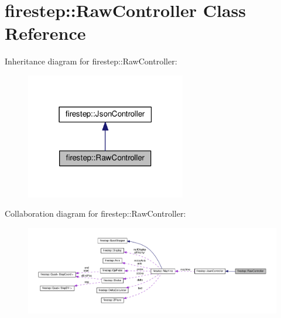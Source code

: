 \hypertarget{classfirestep_1_1_raw_controller}{\section{firestep\+:\+:Raw\+Controller Class Reference}
\label{classfirestep_1_1_raw_controller}
}


Inheritance diagram for firestep\+:\+:Raw\+Controller\+:
\nopagebreak
\begin{figure}[H]
\begin{center}
\leavevmode
\includegraphics[width=198pt]{classfirestep_1_1_raw_controller__inherit__graph}
\end{center}
\end{figure}


Collaboration diagram for firestep\+:\+:Raw\+Controller\+:
\nopagebreak
\begin{figure}[H]
\begin{center}
\leavevmode
\includegraphics[width=350pt]{classfirestep_1_1_raw_controller__coll__graph}
\end{center}
\end{figure}
